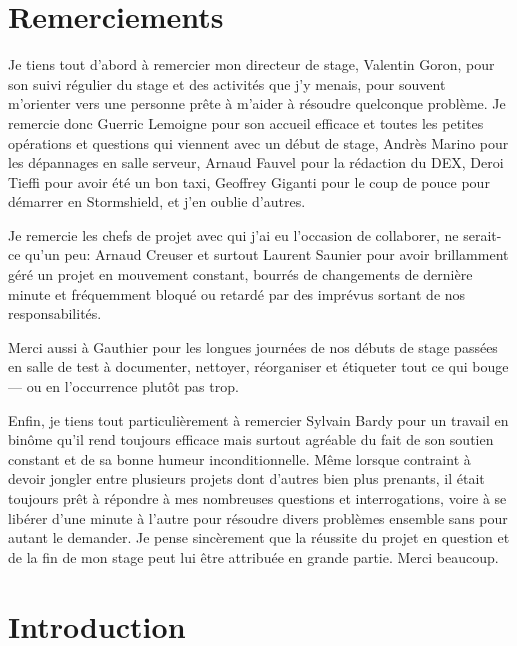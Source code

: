 \documentclass[12pt, oneside, a4paper, titlepage]{report}
\begin{document}
\begin{titlepage}
    
\end{titlepage}

\setcounter{page}{2}
\tableofcontents




\chapter{Remerciements}%
\label{cha:ackn}

Je tiens tout d'abord à remercier mon directeur de stage, Valentin Goron, pour
son suivi régulier du stage et des activités que j'y menais, pour souvent
m'orienter vers une personne prête à m'aider à résoudre quelconque problème. Je
remercie donc Guerric Lemoigne pour son accueil efficace et toutes les petites
opérations et questions qui viennent avec un début de stage, Andrès Marino pour
les dépannages en salle serveur, Arnaud Fauvel pour la rédaction du DEX, Deroi
Tieffi pour avoir été un bon taxi, Geoffrey Giganti pour le coup de pouce pour
démarrer en Stormshield, et j'en oublie d'autres.

Je remercie les chefs de projet avec qui j'ai eu l'occasion de collaborer, ne
serait-ce qu'un peu: Arnaud Creuser et surtout Laurent Saunier pour avoir
brillamment géré un projet en mouvement constant, bourrés de changements de
dernière minute et fréquemment bloqué ou retardé par des imprévus sortant de nos
responsabilités.

Merci aussi à Gauthier pour les longues journées de nos débuts de stage passées
en salle de test à documenter, nettoyer, réorganiser et étiqueter tout ce qui
bouge --- ou en l'occurrence plutôt pas trop.

Enfin, je tiens tout particulièrement à remercier Sylvain Bardy pour un travail
en binôme qu'il rend toujours efficace mais surtout agréable du fait de son
soutien constant et de sa bonne humeur inconditionnelle. Même lorsque contraint
à devoir jongler entre plusieurs projets dont d'autres bien plus prenants, il
était toujours prêt à répondre à mes nombreuses questions et interrogations,
voire à se libérer d'une minute à l'autre pour résoudre divers problèmes
ensemble sans pour autant le demander. Je pense sincèrement que la réussite du
projet en question et de la fin de mon stage peut lui être attribuée en grande
partie. Merci beaucoup.


\chapter{Introduction}%
\label{cha:intro}
\end{document}
